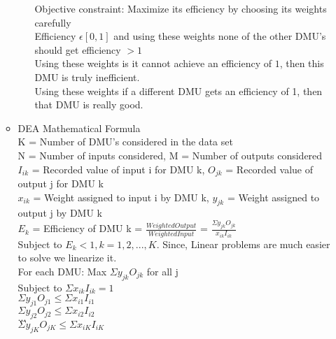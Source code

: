 \documentclass[a4paper]{article}
\begin{document}
\begin{enumerate}
\begin{itemize}
\begin{itemize}
             Objective constraint: Maximize its efficiency by choosing its weights carefully\\
             Efficiency $\epsilon[0,1]$ and using these weights none of the other DMU's should get efficiency $> 1$\\
             Using these weights is it cannot achieve an efficiency of $1$, then this DMU is truly inefficient.\\
             Using these weights if a different DMU gets an efficiency of 1, then that DMU is really good.
         \end{itemize}
         \item DEA Mathematical Formula\\
         K = Number of DMU's considered in the data set\\
         N = Number of inputs considered, M = Number of outputs considered\\
         $I_{ik}$ = Recorded value of input i for DMU k, $O_{jk}$ = Recorded value of output j for DMU k\\
         $x_{ik}$ = Weight assigned to input i by DMU k, $y_{jk}$ = Weight assigned to output j by DMU k \\
         $E_k$ = Efficiency of DMU k = $\frac{Weighted Output}{Weighted Input}$ = $\frac{\Sigma y_{jk}O_{jk}}{x_{ik}I_{ik}}$\\
         Subject to $E_k < 1, k  = 1, 2, ..., K$. Since, Linear problems are much easier to solve we linearize it.\\
         For each DMU: Max $\Sigma y_{jk}O_{jk}$ for all j\\
         Subject to $\Sigma x_{ik}I_{ik} = 1$\\
         $\Sigma y_{j1}O_{j1} \leq \Sigma x_{i1}I_{i1}$\\
          $\Sigma y_{j2}O_{j2} \leq \Sigma x_{i2}I_{i2}$\\
          $...$\\
           $\Sigma y_{jK}O_{jK} \leq \Sigma x_{iK}I_{iK}$
     \end{itemize}
 \end{enumerate}
\end{document}
